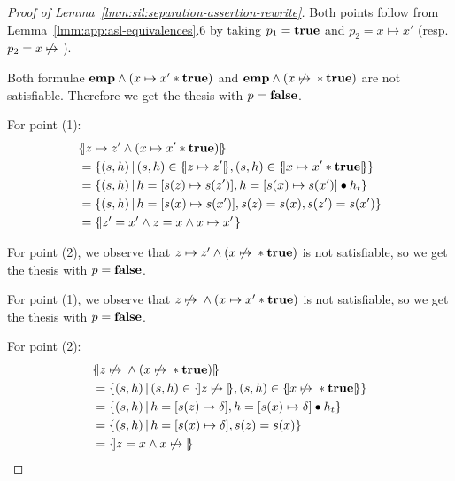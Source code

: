 \begin{proof}[Proof of Lemma~\ref{lmm:sil:separation-assertion-rewrite}]
	Both points follow from Lemma~\ref{lmm:app:asl-equivalences}.6 by taking $p_1 = \textbf{true}$ and $p_2 = x \mapsto x'$ (resp. $p_2 = x \not\mapsto{}$).

	Both formulae $\textbf{emp} \land (x \mapsto x' * \textbf{true})$ and $\textbf{emp} \land (x \not\mapsto{} * \textbf{true})$ are not satisfiable. Therefore we get the thesis with $p = \textbf{false}$.

	For point (1):
	\begin{align*}
		 & \{\hspace{-2pt}|z \mapsto z' \land (x \mapsto x' * \textbf{true})|\hspace{-2pt}\}                                                \\
		 & =\{ (s, h) \,\vert\, (s, h) \in \{\hspace{-2pt}|z \mapsto z'|\hspace{-2pt}\}, (s, h) \in \{\hspace{-2pt}|x \mapsto x' * \textbf{true}|\hspace{-2pt}\} \} \\
		 & =\{ (s, h) \,\vert\, h = [s(z) \mapsto s(z')], h = [s(x) \mapsto s(x')] \bullet h_t \}                       \\
		 & =\{ (s, h) \,\vert\, h = [s(x) \mapsto s(x')], s(z) = s(x), s(z') = s(x') \}                                 \\
		 & =\{\hspace{-2pt}|z' = x' \land z = x \land x \mapsto x'|\hspace{-2pt}\}
	\end{align*}

	For point (2), we observe that $z \mapsto z' \land (x \not\mapsto{} * \textbf{true})$ is not satisfiable, so we get the thesis with $p = \textbf{false}$.

	For point (1), we observe that $z \not\mapsto{}{} \land (x \mapsto x' * \textbf{true})$ is not satisfiable, so we get the thesis with $p = \textbf{false}$.

	For point (2):
	\begin{align*}
		 & \{\hspace{-2pt}|z \not\mapsto{} \land (x \not\mapsto{} * \textbf{true})|\hspace{-2pt}\}                                                \\
		 & =\{ (s, h) \,\vert\, (s, h) \in \{\hspace{-2pt}|z \not\mapsto{}|\hspace{-2pt}\}, (s, h) \in \{\hspace{-2pt}|x \not\mapsto{} * \textbf{true}|\hspace{-2pt}\} \} \\
		 & =\{ (s, h) \,\vert\, h = [s(z) \mapsto \delta], h = [s(x) \mapsto \delta] \bullet h_t \}                 \\
		 & =\{ (s, h) \,\vert\, h = [s(x) \mapsto \delta], s(z) = s(x) \}                                           \\
		 & =\{\hspace{-2pt}|z = x \land x \not\mapsto{}|\hspace{-2pt}\}
	\end{align*}


\end{proof}

